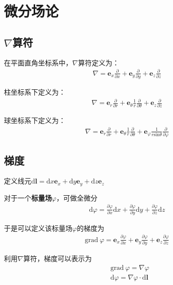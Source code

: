 \documentclass[main.tex]{subfiles}
\begin{document}
\section{微分场论}
\subsection{$\nabla $算符}
在平面直角坐标系中，$\nabla $算符定义为：
\begin{align}
    \nabla = \boldsymbol{e}_x\frac{\partial }{\partial x}+\boldsymbol{e}_y\frac{\partial }{\partial y}+\boldsymbol{e}_z\frac{\partial }{\partial z} 
\end{align}

柱坐标系下定义为：
\begin{align}
    \nabla = \boldsymbol{e}_r\frac{\partial }{\partial r}+\boldsymbol{e}_\theta \frac{1}{r} \frac{\partial }{\partial \theta}+\boldsymbol{e}_z\frac{\partial }{\partial z} 
\end{align}

球坐标系下定义为：
\begin{align}
    \nabla = \boldsymbol{e}_r\frac{\partial }{\partial r}+\boldsymbol{e}_\theta \frac{1}{r} \frac{\partial }{\partial \theta}+\boldsymbol{e}_\varphi \frac{1}{r\mathrm{sin}\theta }\frac{\partial }{\partial \varphi} 
\end{align}

\subsection{梯度}
定义线元$\mathrm{d}\boldsymbol{l} = \mathrm{d}x\boldsymbol{e}_x+\mathrm{d}y\boldsymbol{e}_y+\mathrm{d}z\boldsymbol{e}_z$

对于一个\textbf{标量场}$\varphi $，可做全微分
\begin{align}
    \mathrm{d}\varphi = \frac{\partial \varphi }{\partial x}\mathrm{d}x+\frac{\partial \varphi }{\partial y}\mathrm{d}y+\frac{\partial \varphi }{\partial z}\mathrm{d}z
\end{align}

于是可以定义该标量场$\varphi $的梯度为
\begin{align}
    \mathrm{grad}\ \varphi  =\boldsymbol{e}_x\frac{\partial \varphi }{\partial x}+\boldsymbol{e}_y\frac{\partial \varphi }{\partial y}+\boldsymbol{e}_z\frac{\partial \varphi }{\partial z}
\end{align}

利用$\nabla $算符，梯度可以表示为
\begin{align}
    &\mathrm{grad}\ \varphi  = \nabla \varphi \\
    &\mathrm{d}\varphi = \nabla \varphi \cdot \mathrm{d}\boldsymbol{l}
\end{align}
\end{document}
